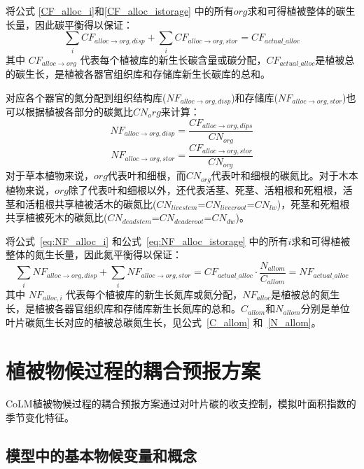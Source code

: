 将公式 \eqref{CF_alloc_i}和\eqref{CF_alloc_istorage} 中的所有$org$求和可得植被整体的碳生长量，因此碳平衡得以保证：
\begin{equation}
  \sum_{i}{CF_{alloc\rightarrow org,disp}}+\sum_{i}{CF_{alloc\rightarrow org,stor}}=CF_{actual\_alloc}
\end{equation}
其中 $CF_{alloc\rightarrow org}$ 代表每个植被库的新生长碳含量或碳分配，$CF_{actual\_alloc}$是植被总的碳生长，是植被各器官组织库和存储库新生长碳库的总和。


 对应各个器官的氮分配到组织结构库($NF_{alloc\rightarrow org,disp}$)和存储库($NF_{alloc\rightarrow org,stor}$)也可以根据植被各部分的碳氮比$CN_org$来计算：
\begin{equation}\label{eq:NF_alloc_i}
  NF_{alloc\rightarrow org,disp} = \frac{CF_{alloc\rightarrow org,dips}}{CN_{org}}
\end{equation}
\begin{equation}\label{eq:NF_alloc_istorage}
  NF_{alloc\rightarrow org,stor} = \frac{CF_{alloc\rightarrow org,stor}}{CN_{org}}
\end{equation}
对于草本植物来说，$org$代表叶和细根，而$CN_{org}$代表叶和细根的碳氮比。对于木本植物来说，$org$除了代表叶和细根以外，还代表活茎、死茎、活粗根和死粗根，活茎和活粗根共享植被活木的碳氮比($CN_{livestem}$=$CN_{livecroot}$=$CN_{lw}$)，死茎和死粗根共享植被死木的碳氮比($CN_{deadstem}$=$CN_{deadcroot}$=$CN_{dw}$)。


将公式~\eqref{eq:NF_alloc_i} 和公式~\eqref{eq:NF_alloc_istorage} 中的所有$i$求和可得植被整体的氮生长量，因此氮平衡得以保证：
\begin{equation}
  \sum_{i}{NF_{alloc\rightarrow org,disp}}+\sum_{i}{NF_{alloc\rightarrow org,stor}}=CF_{actual\_alloc}\cdot \frac{N_{allom}}{C_{allom}}=NF_{actual\_alloc}
\end{equation}
其中 $NF_{alloc,i}$ 代表每个植被库的新生长氮库或氮分配，$NF_{alloc}$是植被总的氮生长，是植被各器官组织库和存储库新生长氮库的总和。$C_{allom}$和$N_{allom}$分别是单位叶片碳氮生长对应的植被总碳氮生长，见公式~\eqref{C_allom} 和~\eqref{N_allom}。


\section{植被物候过程的耦合预报方案}\label{植被物候过程的耦合预报方案}
CoLM植被物候过程的耦合预报方案通过对叶片碳的收支控制，模拟叶面积指数的季节变化特征。


\subsection{模型中的基本物候变量和概念}\label{模型中的基本物候变量和概念}

